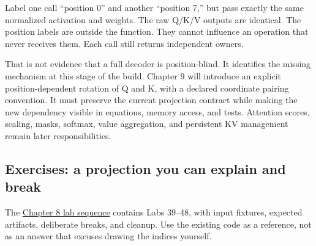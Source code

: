 \documentclass[
  10pt,
]{article}
\begin{document}
Label one call ``position 0'' and another ``position 7,'' but pass
exactly the same normalized activation and weights. The raw Q/K/V
outputs are identical. The position labels are outside the function.
They cannot influence an operation that never receives them. Each call
still returns independent owners.

That is not evidence that a full decoder is position-blind. It
identifies the missing mechanism at this stage of the build. Chapter 9
will introduce an explicit position-dependent rotation of Q and K, with
a declared coordinate pairing convention. It must preserve the current
projection contract while making the new dependency visible in
equations, memory access, and tests. Attention scores, scaling, masks,
softmax, value aggregation, and persistent KV management remain later
responsibilities.

\subsection{Exercises: a projection you can explain and
break}\label{exercises-a-projection-you-can-explain-and-break}

The
\href{https://github.com/hermonai/inside-the-llm-engine/blob/astra-visual-rewrite/labs/lab-39-qkv-projection-workbench.md}{Chapter
8 lab sequence} contains Labs 39--48, with input fixtures, expected
artifacts, deliberate breaks, and cleanup. Use the existing code as a
reference, not as an answer that excuses drawing the indices yourself.
\end{document}
